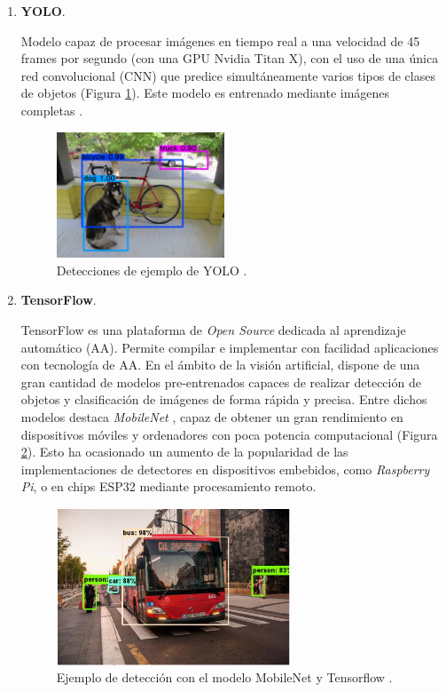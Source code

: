 \begin{enumerate}
	\item \textbf{YOLO}.
	
	Modelo capaz de procesar imágenes en tiempo real a una velocidad de 45 frames por segundo (con una GPU Nvidia Titan X), con el uso de una única red convolucional (CNN) que predice simultáneamente varios tipos de clases de objetos (Figura \ref{fig:yoloExample}). Este modelo es entrenado mediante imágenes completas \cite{YOLO}.
	
	\begin{figure}[htp]
		\centering
		\includegraphics[width=5cm]{imagenes/yolo_example.jpg}
		\caption[Detecciones de ejemplo de YOLO]{Detecciones de ejemplo de YOLO \cite{YOLO}.}
		\label{fig:yoloExample}
	\end{figure}
	
	\item \textbf{TensorFlow}.
	
	TensorFlow es una plataforma de \textit{Open Source} dedicada al aprendizaje automático (AA). Permite compilar e implementar con facilidad aplicaciones con tecnología de AA. En el ámbito de la visión artificial, dispone de una gran cantidad de modelos pre-entrenados capaces de realizar detección de objetos y clasificación de imágenes de forma rápida y precisa. Entre dichos modelos destaca \textit{MobileNet} \cite{mobilenet1}, capaz de obtener un gran rendimiento en dispositivos móviles y ordenadores con poca potencia computacional (Figura \ref{fig:mobilenetExample}). Esto ha ocasionado un aumento de la popularidad de las implementaciones de detectores en dispositivos embebidos, como \textit{Raspberry Pi}, o en chips ESP32 mediante procesamiento remoto.
	
	\begin{figure}[htp]
		\centering
		\includegraphics[width=7cm]{imagenes/mobilenet_example.png}
		\caption[Ejemplo de detección con el modelo MobileNet y Tensorflow.]{Ejemplo de detección con el modelo MobileNet y Tensorflow \cite{mobilenet1}.}
		\label{fig:mobilenetExample}
	\end{figure}
	

\end{enumerate}
